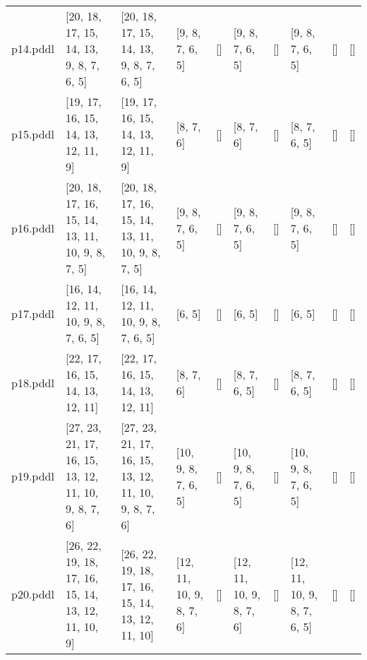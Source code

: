 \documentclass{article}
\begin{document}
\begin{tabular}{@{}lrrrrrrrrr@{}}
p14.pddl & \multicolumn{1}{|l|}{[20, 18, 17, 15, 14, 13, 9, 8, 7, 6, 5]} & \multicolumn{1}{|l|}{[20, 18, 17, 15, 14, 13, 9, 8, 7, 6, 5]} & \multicolumn{1}{|l|}{[9, 8, 7, 6, 5]} & \multicolumn{1}{|l|}{[]} & \multicolumn{1}{|l|}{[9, 8, 7, 6, 5]} & \multicolumn{1}{|l|}{[]} & \multicolumn{1}{|l|}{[9, 8, 7, 6, 5]} & \multicolumn{1}{|l|}{[]} & \multicolumn{1}{|l|}{[]} \\
p15.pddl & \multicolumn{1}{|l|}{[19, 17, 16, 15, 14, 13, 12, 11, 9]} & \multicolumn{1}{|l|}{[19, 17, 16, 15, 14, 13, 12, 11, 9]} & \multicolumn{1}{|l|}{[8, 7, 6]} & \multicolumn{1}{|l|}{[]} & \multicolumn{1}{|l|}{[8, 7, 6]} & \multicolumn{1}{|l|}{[]} & \multicolumn{1}{|l|}{[8, 7, 6, 5]} & \multicolumn{1}{|l|}{[]} & \multicolumn{1}{|l|}{[]} \\
p16.pddl & \multicolumn{1}{|l|}{[20, 18, 17, 16, 15, 14, 13, 11, 10, 9, 8, 7, 5]} & \multicolumn{1}{|l|}{[20, 18, 17, 16, 15, 14, 13, 11, 10, 9, 8, 7, 5]} & \multicolumn{1}{|l|}{[9, 8, 7, 6, 5]} & \multicolumn{1}{|l|}{[]} & \multicolumn{1}{|l|}{[9, 8, 7, 6, 5]} & \multicolumn{1}{|l|}{[]} & \multicolumn{1}{|l|}{[9, 8, 7, 6, 5]} & \multicolumn{1}{|l|}{[]} & \multicolumn{1}{|l|}{[]} \\
p17.pddl & \multicolumn{1}{|l|}{[16, 14, 12, 11, 10, 9, 8, 7, 6, 5]} & \multicolumn{1}{|l|}{[16, 14, 12, 11, 10, 9, 8, 7, 6, 5]} & \multicolumn{1}{|l|}{[6, 5]} & \multicolumn{1}{|l|}{[]} & \multicolumn{1}{|l|}{[6, 5]} & \multicolumn{1}{|l|}{[]} & \multicolumn{1}{|l|}{[6, 5]} & \multicolumn{1}{|l|}{[]} & \multicolumn{1}{|l|}{[]} \\
p18.pddl & \multicolumn{1}{|l|}{[22, 17, 16, 15, 14, 13, 12, 11]} & \multicolumn{1}{|l|}{[22, 17, 16, 15, 14, 13, 12, 11]} & \multicolumn{1}{|l|}{[8, 7, 6]} & \multicolumn{1}{|l|}{[]} & \multicolumn{1}{|l|}{[8, 7, 6, 5]} & \multicolumn{1}{|l|}{[]} & \multicolumn{1}{|l|}{[8, 7, 6, 5]} & \multicolumn{1}{|l|}{[]} & \multicolumn{1}{|l|}{[]} \\
p19.pddl & \multicolumn{1}{|l|}{[27, 23, 21, 17, 16, 15, 13, 12, 11, 10, 9, 8, 7, 6]} & \multicolumn{1}{|l|}{[27, 23, 21, 17, 16, 15, 13, 12, 11, 10, 9, 8, 7, 6]} & \multicolumn{1}{|l|}{[10, 9, 8, 7, 6, 5]} & \multicolumn{1}{|l|}{[]} & \multicolumn{1}{|l|}{[10, 9, 8, 7, 6, 5]} & \multicolumn{1}{|l|}{[]} & \multicolumn{1}{|l|}{[10, 9, 8, 7, 6, 5]} & \multicolumn{1}{|l|}{[]} & \multicolumn{1}{|l|}{[]} \\
p20.pddl & \multicolumn{1}{|l|}{[26, 22, 19, 18, 17, 16, 15, 14, 13, 12, 11, 10, 9]} & \multicolumn{1}{|l|}{[26, 22, 19, 18, 17, 16, 15, 14, 13, 12, 11, 10]} & \multicolumn{1}{|l|}{[12, 11, 10, 9, 8, 7, 6]} & \multicolumn{1}{|l|}{[]} & \multicolumn{1}{|l|}{[12, 11, 10, 9, 8, 7, 6]} & \multicolumn{1}{|l|}{[]} & \multicolumn{1}{|l|}{[12, 11, 10, 9, 8, 7, 6, 5]} & \multicolumn{1}{|l|}{[]} & \multicolumn{1}{|l|}{[]} \\
\end{tabular}
\end{document}
